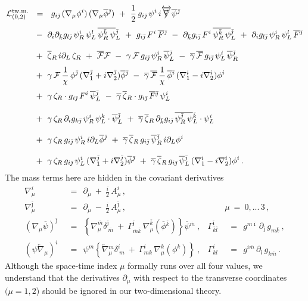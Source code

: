 \documentclass[12pt]{article}
\newcommand{\p}{\partial}
\newcommand{\ov}{\overline}
\newcommand{\mc}[1]{\mathcal{#1}}
\def\slashed#1{\setbox0=\hbox{$#1$}             %
   \dimen0=\wd0                                 %
   \setbox1=\hbox{/} \dimen1=\wd1               %
   \ifdim\dimen0>\dimen1                        %
      \rlap{\hbox to \dimen0{\hfil/\hfil}}      %
      #1                                        %
   \else                                        %
      \rlap{\hbox to \dimen1{\hfil$#1$\hfil}}   %
      /                                         %
   \fi}                                        %
\newcommand{\bzr}{\ov{\zeta}{}_R}
\newcommand{\zr}{\zeta_R}
\newcommand{\bgamma}{\ov{\gamma}}
\newcommand{\bpsi}{\ov{\psi}{}}
\newcommand{\bphi}{\ov{\phi}{}}
\newcommand{\ff}{\mc{F}}
\newcommand{\bff}{\ov{\mc{F}}}
\newcommand{\bi}{{\bar \imath}}
\newcommand{\bj}{{\bar \jmath}}
\newcommand{\bk}{{\bar k}}
\newcommand{\bl}{{\bar l}}
\newcommand{\bm}{{\bar m}}
\begin{document}
\begin{align}
%
\notag
	\mc{L}_{(0,2)}^\text{tw.m.} & ~~=~~ 
	g_{i\bj}\,(\nabla_\mu \phi^i)\, (\nabla_\mu\ov{\phi}{}^\bj)
	~+~ \frac{1}{2}\, g_{i\bj}\, \psi^i\, i\overleftrightarrow{\slashed{\nabla}} \ov{\psi}{}^\bj
	\\[1mm]
%
\notag
	&~
	~-~ \p_i\p_\bk g_{l\bj}\, \psi^i_{R}\, \psi^l_{L}\, \ov{\psi^\bk_{R}\, \psi}{}^\bj_{L}
	~+~ g_{i\bj}\, F^i\,\ov{F}{}^\bj
	~-~ \p_\bk g_{i\bj}\, F^i\, \ov{\psi_R^\bk\, \psi}{}_L^\bj
	~+~ \p_i g_{l\bj}\, \psi_R^i\, \psi_L^l\, \ov{F}{}^\bj
	\\[3mm]
%
\notag
	&~
	~+~ \bzr\, i\p_L\, \zr ~+~ \bff \ff 
	~-~ \gamma\, \ff\, g_{i\bj}\, \psi_R^i\, \bpsi_L^\bj 
	~-~ \bgamma\, \bff\, g_{i\bj}\, \psi_L^i\, \bpsi_R^\bj
	\\[1mm]
%
\label{geomlin}
	&~
	~+~ \gamma\, \ff\, \frac{1}{\chi}\,\phi^\bj\, (\nabla_1^\bj + i \nabla_2^\bj) \bphi^\bj
	~-~ \bgamma\, \bff\, \frac{1}{\chi}\,\bphi^\bi\, (\nabla_1^i - i \nabla_2^i) \phi^i
	\\[1mm]
%
\notag
	&~
	~+~ \gamma\,\zr\cdot g_{i\bj}\, F^i\, \bpsi_L^\bj
	~-~ \bgamma\, \bzr\cdot g_{i\bj}\, \ov{F}{}^\bj\, \psi_L^i
	\\[3mm]
%
\notag
	&~
	~+~ \gamma\, \zr\, \p_i g_{k\bj}\, \psi_R^i\, \psi_L^k \cdot \bpsi_L^\bj
	~+~ \bgamma\, \bzr\, \p_\bk g_{i\bj}\, \ov{\psi_R^\bj\, \psi}{}_L^\bk \cdot \psi_L^i
	\\[3mm]
%	
\notag
	&~
	~+~ \gamma\, \zr\, g_{i\bj}\, \psi_R^i\, i\p_L \bphi^\bj
	~+~ \bgamma\, \bzr\, g_{i\bj}\, \bpsi_R^\bj\, i\p_L \phi^i
	\\[3mm]
%
\notag
	&~
	~+~ \gamma\, \zr\, g_{i\bj}\, \psi_L^i\, (\nabla_1^\bj + i\nabla_2^\bj) \bphi^\bj
	~+~ \bgamma\, \bzr\, g_{i\bj}\, \bpsi_L^\bj\, (\nabla_1^i - i\nabla_2^i) \phi^i
	\,.
\end{align}
	The mass terms here are hidden in the covariant derivatives
\begin{align*}
%
	\nabla_\mu^i & ~~=~~ \p_\mu ~+~ \frac{i}{2}\,A_\mu^i\,,  \\[3mm]
%
	\nabla_\mu^\bj & ~~=~~ \p_\mu ~-~ \frac{i}{2}\,A_\mu^\bj \,,
	&& \!\!\!\!\!\!\! \mu ~=~ 0,...\,3\,,
	\\[3mm]
%
	(\nabla_\mu \ov{\psi})^\bj & ~~=~~ \left\{ \nabla_\mu^\bm \delta^\bj_{\ \bm} ~+~
						\Gamma_{\bm\bk}^\bj\, \nabla_\mu^\bk (\ov{\phi}{}^\bk) \right\} \ov{\psi}{}^\bm~,
	& \Gamma^\bi_{\bk\bl} & ~~=~~ g^{m\bi}\,\p_\bl\, g_{m\bk}~,
	\\[3mm]
%
	(\psi \overleftarrow{\nabla}{}_\mu)^i & ~~=~~ 
			\psi^m \left\{ \overleftarrow{\nabla}{}_\mu^m \delta^i_{\ m} ~+~
						\Gamma^i_{mk}\, \nabla_\mu^k (\phi^k) \right\}~,
	& \Gamma^i_{kl} & ~~=~~ g^{i\bm}\, \p_l\, g_{k\bm}\,.
\end{align*}
	Although the space-time index $\mu$ formally runs over all four values, we understand
	that the derivatives $ \p_\mu $ with respect to the transverse coordinates 
	$(\mu=1,2$) should be ignored in our two-dimensional
	theory.
\end{document}
